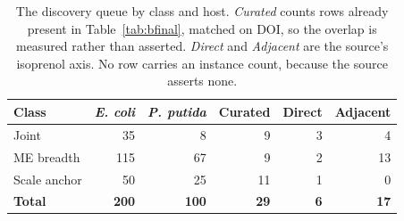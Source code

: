 \begingroup
\footnotesize
\begin{longtable}{@{}L{34mm} r r r r r@{}}
\caption[]{The discovery queue by class and host. \emph{Curated} counts rows already present in Table~\ref{tab:bfinal}, matched on DOI, so the overlap is measured rather than asserted. \emph{Direct} and \emph{Adjacent} are the source's isoprenol axis. No row carries an instance count, because the source asserts none.}
\label{tab:bqueue}\\
\toprule
\textbf{Class} & \textbf{\emph{E. coli}} & \textbf{\emph{P. putida}} & \textbf{Curated} & \textbf{Direct} & \textbf{Adjacent} \\
\midrule
\endfirsthead
\bottomrule
\endfoot
Joint & 35 & 8 & 9 & 3 & 4 \\
ME breadth & 115 & 67 & 9 & 2 & 13 \\
Scale anchor & 50 & 25 & 11 & 1 & 0 \\
\midrule
\textbf{Total} & \textbf{200} & \textbf{100} & \textbf{29} & \textbf{6} & \textbf{17} \\
\end{longtable}
\endgroup
